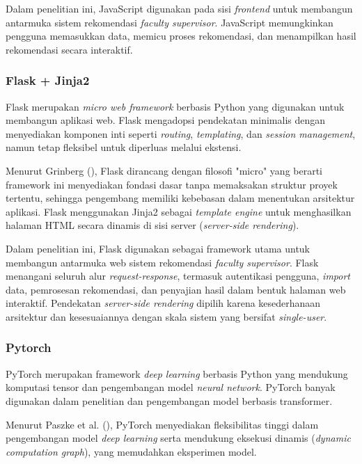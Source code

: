 Dalam penelitian ini, JavaScript digunakan pada sisi \textit{frontend} untuk membangun antarmuka sistem rekomendasi \textit{faculty supervisor}. JavaScript memungkinkan pengguna memasukkan data, memicu proses rekomendasi, dan menampilkan hasil rekomendasi secara interaktif.

\subsubsection{Flask + Jinja2}\label{flask-jinja2}

Flask merupakan \textit{micro web framework} berbasis Python yang digunakan untuk membangun aplikasi web. Flask mengadopsi pendekatan minimalis dengan menyediakan komponen inti seperti \textit{routing}, \textit{templating}, dan \textit{session management}, namun tetap fleksibel untuk diperluas melalui ekstensi.

Menurut Grinberg (\citeyear{grinberg2018flask}), Flask dirancang dengan filosofi "micro" yang berarti framework ini menyediakan fondasi dasar tanpa memaksakan struktur proyek tertentu, sehingga pengembang memiliki kebebasan dalam menentukan arsitektur aplikasi. Flask menggunakan Jinja2 sebagai \textit{template engine} untuk menghasilkan halaman HTML secara dinamis di sisi server (\textit{server-side rendering}).

Dalam penelitian ini, Flask digunakan sebagai framework utama untuk membangun antarmuka web sistem rekomendasi \textit{faculty supervisor}. Flask menangani seluruh alur \textit{request-response}, termasuk autentikasi pengguna, \textit{import} data, pemrosesan rekomendasi, dan penyajian hasil dalam bentuk halaman web interaktif. Pendekatan \textit{server-side rendering} dipilih karena kesederhanaan arsitektur dan kesesuaiannya dengan skala sistem yang bersifat \textit{single-user}.

\subsubsection{Pytorch}\label{pytorch}

PyTorch merupakan framework \textit{deep learning} berbasis Python yang mendukung komputasi tensor dan pengembangan model \textit{neural network}. PyTorch banyak digunakan dalam penelitian dan pengembangan model berbasis transformer.

Menurut Paszke et al. (\citeyear{paszke2019pytorch}), PyTorch menyediakan fleksibilitas tinggi dalam pengembangan model \textit{deep learning} serta mendukung eksekusi dinamis (\textit{dynamic computation graph}), yang memudahkan eksperimen model.

